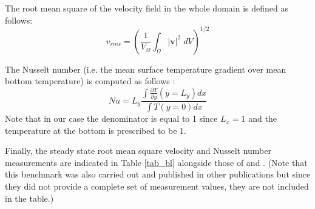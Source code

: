 The root mean square of the velocity field in the whole domain is defined as 
follows:
\begin{equation}
v_{rms}= \left( \frac{1}{V_\Omega} \int_\Omega |{\bm v}|^2 \; dV \right)^{1/2} \label{eq_vrms}
\end{equation}


The Nusselt number (i.e. the mean surface temperature gradient over mean bottom temperature)
is computed as follows \cite{blbc89}:
\begin{equation}
Nu = L_y \frac{\int \frac{\partial T}{\partial y}(y=L_y) dx  }{\int T(y=0) dx}
\label{eqNu}
\end{equation}
Note that in our case the denominator is equal to 1 since $L_x=1$ and the temperature at the 
bottom is prescribed to be 1.


Finally, the steady state root mean square velocity and Nusselt number measurements
are indicated in Table \ref{tab_bl} alongside those of \cite{blbc89} and \cite{tack94}.
(Note that this benchmark was also carried out and published in 
other publications \cite{trha98,albe00,gery10,dawk11,lezh11} but since they did not provide  a complete set 
of measurement values, they are not included in the table.)






